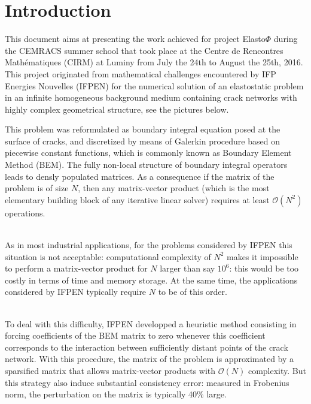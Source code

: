 \section*{Introduction}

This document aims at presenting the work achieved for project Elasto$\Phi$ during the CEMRACS summer school  
that took place at the Centre de Rencontres Mathématiques (CIRM) at Luminy from  July the 24th to 
August the 25th, 2016. This project originated from mathematical challenges encountered by IFP Energies Nouvelles (IFPEN)
for the numerical solution of an elastostatic problem in an infinite homogeneous background medium containing crack 
networks with highly complex geometrical structure, see the pictures below. 

\begin{figure}[h!]
\vspace{5cm}
\end{figure}


\noindent 
This problem was reformulated as boundary integral equation posed at the surface of cracks, and 
discretized by means of Galerkin procedure based on piecewise constant functions, which is commonly known as 
Boundary Element Method (BEM). The fully non-local structure of boundary integral operators leads to  
densly populated matrices. As a consequence if the matrix of the problem is of size $N$, 
then any matrix-vector product (which is the most elementary building block of any iterative linear solver)
requires at least $\mathcal{O}(N^{2})$ operations.

\quad\\
As in most industrial applications, for the problems considered by IFPEN this situation is not acceptable: 
computational complexity of $N^{2}$ makes it impossible to perform a matrix-vector product for $N$ larger than
say $10^{6}$: this would be too costly in terms of time and memory storage. At the same time, the  applications 
considered by IFPEN typically require $N$ to be of this order.

\quad\\
To deal with this difficulty, IFPEN developped a heuristic method consisting in forcing coefficients of the 
BEM matrix to zero whenever this coefficient corresponds to the interaction between sufficiently distant points 
of the crack network. With this procedure, the matrix of the problem is approximated by a sparsified matrix that 
allows matrix-vector products with $\mathcal{O}(N)$ complexity. But this strategy also induce substantial consistency 
error: measured in Frobenius norm, the perturbation on the matrix is typically  40\% large.


